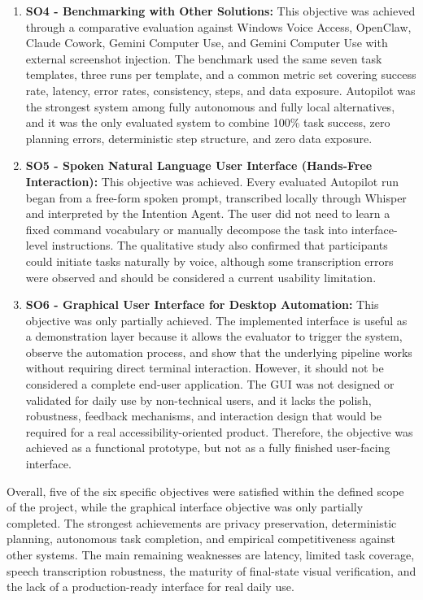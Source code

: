 \begin{enumerate}
\item \textbf{SO4 - Benchmarking with Other Solutions:} This objective was achieved through a comparative evaluation against Windows Voice Access, OpenClaw, Claude Cowork, Gemini Computer Use, and Gemini Computer Use with external screenshot injection. The benchmark used the same seven task templates, three runs per template, and a common metric set covering success rate, latency, error rates, consistency, steps, and data exposure. Autopilot was the strongest system among fully autonomous and fully local alternatives, and it was the only evaluated system to combine 100\% task success, zero planning errors, deterministic step structure, and zero data exposure.

\item \textbf{SO5 - Spoken Natural Language User Interface (Hands-Free Interaction):} This objective was achieved. Every evaluated Autopilot run began from a free-form spoken prompt, transcribed locally through Whisper and interpreted by the Intention Agent. The user did not need to learn a fixed command vocabulary or manually decompose the task into interface-level instructions. The qualitative study also confirmed that participants could initiate tasks naturally by voice, although some transcription errors were observed and should be considered a current usability limitation.

\item \textbf{SO6 - Graphical User Interface for Desktop Automation:} This objective was only partially achieved. The implemented interface is useful as a demonstration layer because it allows the evaluator to trigger the system, observe the automation process, and show that the underlying pipeline works without requiring direct terminal interaction. However, it should not be considered a complete end-user application. The GUI was not designed or validated for daily use by non-technical users, and it lacks the polish, robustness, feedback mechanisms, and interaction design that would be required for a real accessibility-oriented product. Therefore, the objective was achieved as a functional prototype, but not as a fully finished user-facing interface.
\end{enumerate}

Overall, five of the six specific objectives were satisfied within the defined scope of the project, while the graphical interface objective was only partially completed. The strongest achievements are privacy preservation, deterministic planning, autonomous task completion, and empirical competitiveness against other systems. The main remaining weaknesses are latency, limited task coverage, speech transcription robustness, the maturity of final-state visual verification, and the lack of a production-ready interface for real daily use.

